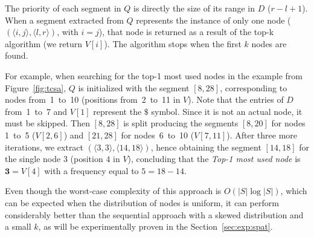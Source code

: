 \begin{itemize}
\begin{itemize}
	The priority of each segment in $Q$ is
	directly the size of its range in $D$ ($r-l+1$). 
	When a segment extracted from $Q$ represents the instance of only one node ($(\langle i,j\rangle, \langle l,r\rangle)$, with $i=j$),
	that node is returned as a result of the top-k algorithm (we return $V[i]$). The algorithm stops when the first $k$ nodes are found.

	For example, when searching for the top-1 most used nodes in the example from Figure~\ref{fig:tcsa}, $Q$ is initialized with
	the segment $[8, 28]$, corresponding to nodes from~1~to~10 (positions from~2~to~11 in $V$). Note
	that the entries of $D$ from~1~to~7 and $V[1]$ represent the $\$$ symbol. Since it is not an actual node, it
	 must be skipped. Then $[8, 28]$ is split producing the segments $[8, 20]$ for nodes 1~to~5 ($V[2,6]$)
	and $[21, 28]$ for nodes~6~to~10 ($V[7,11]$). After three more iterations, we extract
	$(\langle 3,3\rangle, \langle 14,18\rangle)$, hence obtaining the segment $[14, 18]$ for
	the single node 3 (position $4$ in $V$), concluding that the  {\em Top-1 most used node} is 
	$\mathbf{3}=V[4]$ with a frequency equal to $5=18-14$.
	
	Even though the worst-case complexity of this approach is $O(|S|\log|S|)$, which can be expected when the distribution of nodes is uniform, it can perform considerably better than the sequential approach with a skewed distribution and a small $k$, as will be experimentally proven in the Section~\ref{sec:exp:spat}.




\end{itemize}
\end{itemize}
